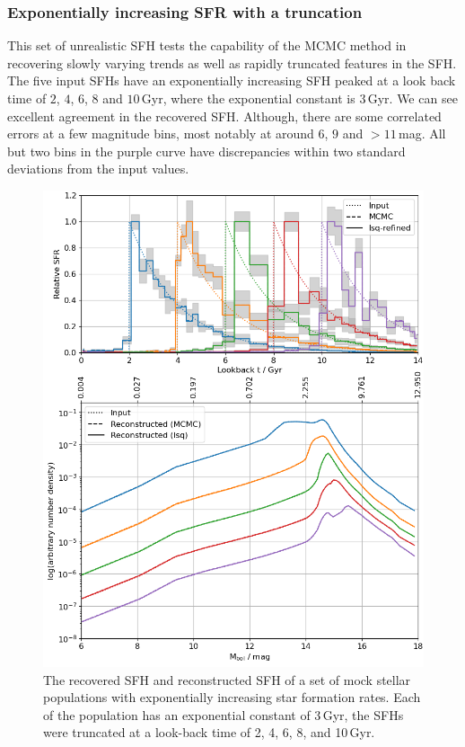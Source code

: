 \documentclass[fleqn,usenatbib]{mnras}
\begin{document}
\subsubsection*{Exponentially increasing SFR with a truncation}
This set of unrealistic SFH tests the capability of the MCMC method in
recovering slowly varying trends as well as rapidly truncated features in the SFH.
The five input SFHs have an exponentially increasing SFH peaked at a look back
time of $2$, $4$, $6$, $8$ and $10$\,Gyr, where the exponential constant is
$3$\,Gyr. We can see excellent agreement in the recovered SFH. Although, there
are some correlated errors at a few magnitude bins, most notably at around $6$,
$9$ and $>11$\,mag. All but two bins in the purple curve have discrepancies
within two standard deviations from the input values. 

\begin{figure}
  \includegraphics[width=\columnwidth]{figures/fig_01_exponential_decay_wdlf.png}
  \caption{The recovered SFH and reconstructed SFH of a set of mock stellar
  populations with exponentially increasing star formation rates. Each of
  the population has an exponential constant of 3\,Gyr, the SFHs were truncated at
  a look-back time of 2, 4, 6, 8, and 10\,Gyr.}
  \label{fig:exponential_sfh}
\end{figure}
\end{document}
